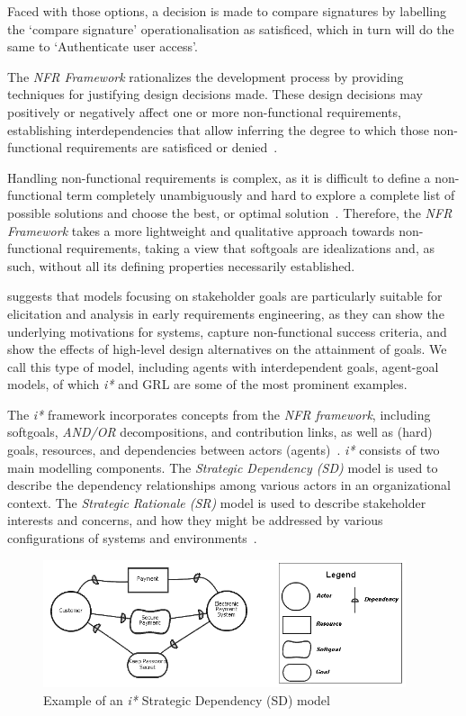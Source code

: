 \documentclass[dissertation,final]{softeng}
\begin{document}
Faced with those options, a decision is made to compare signatures by labelling the `compare signature' operationalisation as satisficed, which in turn will do the same to `Authenticate user access'.

The \emph{NFR Framework} rationalizes the development process by providing techniques for justifying design decisions made. These design decisions may positively or negatively affect one or more non-functional requirements, establishing interdependencies that allow inferring the degree to which those non-functional requirements are satisficed or denied~\citep{Chung2000}.

Handling non-functional requirements is complex, as it is difficult to define a non-functional term completely unambiguously and hard to explore a complete list of possible solutions and choose the best, or optimal solution~\citep{Chung:2009vg}. Therefore, the \emph{NFR Framework} takes a more lightweight and qualitative approach towards non-functional requirements, taking a view that softgoals are idealizations and, as such, without all its defining properties necessarily established.

\citet{Horkoff2012} suggests that models focusing on stakeholder goals are particularly suitable for elicitation and analysis in early requirements engineering, as they can show the underlying motivations for systems, capture non-functional success criteria, and show the effects of high-level design alternatives on the attainment of goals. We call this type of model, including agents with interdependent goals, agent-goal models, of which \emph{i*} and GRL are some of the most prominent examples.

The \emph{i*} framework incorporates concepts from the \emph{NFR framework}, including softgoals, \emph{AND/OR} decompositions, and contribution links, as well as (hard) goals, resources, and dependencies between actors (agents)~\citep{Horkoff2013}. \emph{i*} consists of two main modelling components. The \emph{Strategic Dependency (SD)} model is used to describe the dependency relationships among various actors in an organizational context. The \emph{Strategic Rationale (SR)} model is used to describe stakeholder interests and concerns, and how they might be addressed by various configurations of systems and environments~\citep{Yu1997}.

\begin{figure}[h]
\includegraphics[width=0.95\textwidth]{istar_example}
\centering
\caption[Example of an \emph{i*} Strategic Dependency (SD) model]{Example of an \emph{i*} Strategic Dependency (SD) model~\citep{Roy:2007wyba}}
\label{fig:istar_example}
\end{figure}
\end{document}

